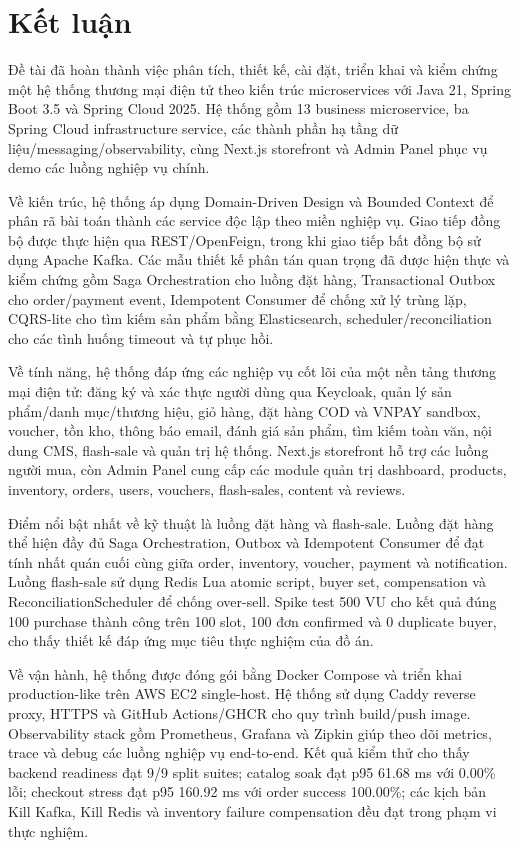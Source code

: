 \documentclass[../DoAn.tex]{subfiles}
\begin{document}
\section*{Kết luận}

Đề tài đã hoàn thành việc phân tích, thiết kế, cài đặt, triển khai và kiểm chứng một hệ thống
thương mại điện tử theo kiến trúc microservices với Java 21, Spring Boot 3.5 và Spring Cloud
2025. Hệ thống gồm 13 business microservice, ba Spring Cloud infrastructure service, các
thành phần hạ tầng dữ liệu/messaging/observability, cùng Next.js storefront và Admin Panel
phục vụ demo các luồng nghiệp vụ chính.

Về kiến trúc, hệ thống áp dụng Domain-Driven Design và Bounded Context để phân rã bài toán
thành các service độc lập theo miền nghiệp vụ. Giao tiếp đồng bộ được thực hiện qua
REST/OpenFeign, trong khi giao tiếp bất đồng bộ sử dụng Apache Kafka. Các mẫu thiết kế phân
tán quan trọng đã được hiện thực và kiểm chứng gồm Saga Orchestration cho luồng đặt hàng,
Transactional Outbox cho order/payment event, Idempotent Consumer để chống xử lý trùng lặp,
CQRS-lite cho tìm kiếm sản phẩm bằng Elasticsearch, scheduler/reconciliation cho các tình
huống timeout và tự phục hồi.

Về tính năng, hệ thống đáp ứng các nghiệp vụ cốt lõi của một nền tảng thương mại điện tử:
đăng ký và xác thực người dùng qua Keycloak, quản lý sản phẩm/danh mục/thương hiệu, giỏ hàng,
đặt hàng COD và VNPAY sandbox, voucher, tồn kho, thông báo email, đánh giá sản phẩm, tìm kiếm
toàn văn, nội dung CMS, flash-sale và quản trị hệ thống. Next.js storefront hỗ trợ các luồng
người mua, còn Admin Panel cung cấp các module quản trị dashboard, products, inventory, orders,
users, vouchers, flash-sales, content và reviews.

Điểm nổi bật nhất về kỹ thuật là luồng đặt hàng và flash-sale. Luồng đặt hàng thể hiện đầy đủ
Saga Orchestration, Outbox và Idempotent Consumer để đạt tính nhất quán cuối cùng giữa order,
inventory, voucher, payment và notification. Luồng flash-sale sử dụng Redis Lua atomic script,
buyer set, compensation và ReconciliationScheduler để chống over-sell. Spike test 500 VU cho
kết quả đúng 100 purchase thành công trên 100 slot, 100 đơn confirmed và 0 duplicate buyer,
cho thấy thiết kế đáp ứng mục tiêu thực nghiệm của đồ án.

Về vận hành, hệ thống được đóng gói bằng Docker Compose và triển khai production-like trên AWS
EC2 single-host. Hệ thống sử dụng Caddy reverse proxy, HTTPS và GitHub Actions/GHCR cho quy
trình build/push image. Observability stack gồm Prometheus, Grafana và Zipkin giúp theo dõi metrics,
trace và debug các luồng nghiệp vụ end-to-end. Kết quả kiểm thử cho thấy backend readiness
đạt 9/9 split suites; catalog soak đạt p95 61.68 ms với 0.00\% lỗi; checkout stress đạt p95
160.92 ms với order success 100.00\%; các kịch bản Kill Kafka, Kill Redis và inventory
failure compensation đều đạt trong phạm vi thực nghiệm.
\end{document}
